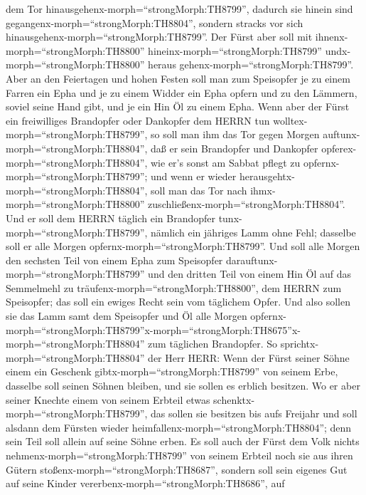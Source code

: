 dem Tor hinausgehenx-morph=``strongMorph:TH8799'', dadurch sie hinein
sind gegangenx-morph=``strongMorph:TH8804'', sondern stracks vor sich
hinausgehenx-morph=``strongMorph:TH8799''.  Der Fürst aber
soll mit ihnenx-morph=``strongMorph:TH8800''
hineinx-morph=``strongMorph:TH8799'' undx-morph=``strongMorph:TH8800''
heraus gehenx-morph=``strongMorph:TH8799''.  Aber an den
Feiertagen und hohen Festen soll man zum Speisopfer je zu einem Farren
ein Epha und je zu einem Widder ein Epha opfern und zu den Lämmern,
soviel seine Hand gibt, und je ein Hin Öl zu einem Epha. 
Wenn aber der Fürst ein freiwilliges Brandopfer oder Dankopfer dem HERRN
tun wolltex-morph=``strongMorph:TH8799'', so soll man ihm das Tor gegen
Morgen auftunx-morph=``strongMorph:TH8804'', daß er sein Brandopfer und
Dankopfer opferex-morph=``strongMorph:TH8804'', wie er's sonst am Sabbat
pflegt zu opfernx-morph=``strongMorph:TH8799''; und wenn er wieder
herausgehtx-morph=``strongMorph:TH8804'', soll man das Tor nach
ihmx-morph=``strongMorph:TH8800''
zuschließenx-morph=``strongMorph:TH8804''.  Und er soll dem
HERRN täglich ein Brandopfer tunx-morph=``strongMorph:TH8799'', nämlich
ein jähriges Lamm ohne Fehl; dasselbe soll er alle Morgen
opfernx-morph=``strongMorph:TH8799''.  Und soll alle Morgen
den sechsten Teil von einem Epha zum Speisopfer
darauftunx-morph=``strongMorph:TH8799'' und den dritten Teil von einem
Hin Öl auf das Semmelmehl zu träufenx-morph=``strongMorph:TH8800'', dem
HERRN zum Speisopfer; das soll ein ewiges Recht sein vom täglichem
Opfer.  Und also sollen sie das Lamm samt dem Speisopfer
und Öl alle Morgen
opfernx-morph=``strongMorph:TH8799''\textbar x-morph=``strongMorph:TH8675''x-morph=``strongMorph:TH8804''
zum täglichen Brandopfer.  So
sprichtx-morph=``strongMorph:TH8804'' der Herr HERR: Wenn der Fürst
seiner Söhne einem ein Geschenk gibtx-morph=``strongMorph:TH8799'' von
seinem Erbe, dasselbe soll seinen Söhnen bleiben, und sie sollen es
erblich besitzen.  Wo er aber seiner Knechte einem von
seinem Erbteil etwas schenktx-morph=``strongMorph:TH8799'', das sollen
sie besitzen bis aufs Freijahr und soll alsdann dem Fürsten wieder
heimfallenx-morph=``strongMorph:TH8804''; denn sein Teil soll allein auf
seine Söhne erben.  Es soll auch der Fürst dem Volk nichts
nehmenx-morph=``strongMorph:TH8799'' von seinem Erbteil noch sie aus
ihren Gütern stoßenx-morph=``strongMorph:TH8687'', sondern soll sein
eigenes Gut auf seine Kinder vererbenx-morph=``strongMorph:TH8686'', auf
